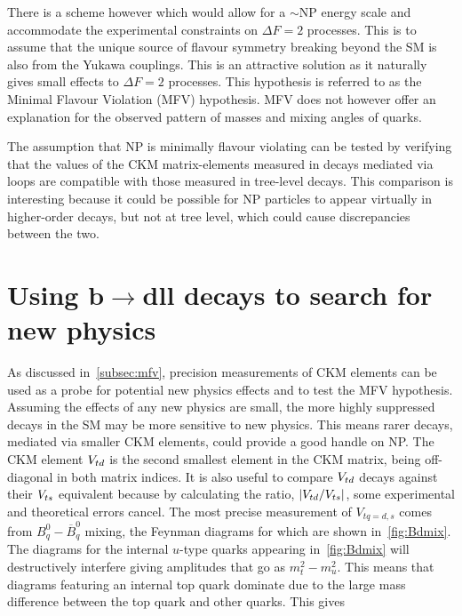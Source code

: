 There is a scheme however which would allow for a $\sim$\tev NP energy scale and accommodate the experimental constraints on $\Delta F = 2$ processes. This is to assume that the unique source of flavour symmetry breaking beyond the SM is also from the Yukawa couplings. This is an attractive solution as it naturally gives small effects to $\Delta F = 2$ processes. This hypothesis is referred to as the Minimal Flavour Violation (MFV) hypothesis. MFV does not however offer an explanation for the observed pattern of masses and mixing angles of quarks.

The assumption that NP is minimally flavour violating can be tested by verifying that the values of the CKM matrix-elements measured in decays mediated via loops are compatible with those measured in tree-level decays. This comparison is interesting because it could be possible for NP particles to appear virtually in higher-order decays, but not at tree level, which could cause discrepancies between the two.
\section[Using b\to dll decays to search for new physics]{Using $\mathbold{b\to dll}$ decays to search for new physics}

\label{sec:bdll}
As discussed in~\autoref{subsec:mfv}, precision measurements of CKM elements can be used as a probe for potential new physics effects and to test the MFV hypothesis. Assuming the effects of any new physics are small, the more highly suppressed decays in the SM may be more sensitive to new physics. This means rarer decays, mediated via smaller CKM elements, could provide a good handle on NP. The CKM element ${V_{{t}{d}}}$ is the second smallest element in the CKM matrix, being off-diagonal in both matrix indices. It is also useful to compare ${V_{{t}{d}}}$ decays against their ${V_{{t}{s}}}$ equivalent because by calculating the ratio, $|{V_{{t}{d}}}/{V_{{t}{s}}}|$, some experimental and theoretical errors cancel. The most precise measurement of $V_{tq = d,s}$ comes from $B^{0}_{q} - \overline{B}^{0}_{q}$ mixing, the Feynman diagrams for which are shown in~\autoref{fig:Bdmix}.
The diagrams for the internal $u$-type quarks appearing in~\autoref{fig:Bdmix} will destructively interfere giving amplitudes that go as $m^{2}_{t}-m^{2}_{u}$. This means that diagrams featuring an internal top quark dominate due to the large mass difference between the top quark and other quarks. This gives

